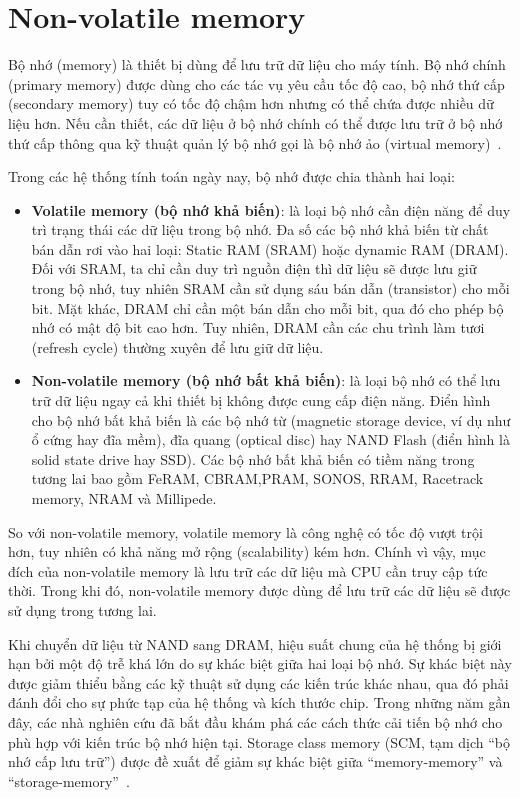 \section{Non-volatile memory}
\label{chap:non-volatile-memory}

Bộ nhớ (memory) là thiết bị dùng để lưu trữ dữ liệu cho máy tính. Bộ nhớ chính
(primary memory) được dùng cho các tác vụ yêu cầu tốc độ cao, bộ nhớ thứ cấp
(secondary memory) tuy có tốc độ chậm hơn nhưng có thể chứa được nhiều dữ liệu
hơn. Nếu cần thiết, các dữ liệu ở bộ nhớ chính có thể được lưu trữ ở bộ nhớ thứ
cấp thông qua kỹ thuật quản lý bộ nhớ gọi là bộ nhớ ảo (virtual
memory)~\cite{VolatileNonVolatileComputer}.

Trong các hệ thống tính toán ngày nay, bộ nhớ được chia thành hai loại:

\begin{itemize}
    \item \textbf{Volatile memory (bộ nhớ khả biến)}: là loại bộ nhớ cần điện
    năng để duy trì trạng thái các dữ liệu trong bộ nhớ. Đa số các bộ nhớ khả
    biến từ chất bán dẫn rơi vào hai loại: Static RAM (SRAM) hoặc dynamic RAM
    (DRAM). Đối với SRAM, ta chỉ cần duy trì nguồn điện thì dữ liệu sẽ được lưu
    giữ trong bộ nhớ, tuy nhiên SRAM cần sử dụng sáu bán dẫn (transistor) cho
    mỗi bit. Mặt khác, DRAM chỉ cần một bán dẫn cho mỗi bit, qua đó cho phép bộ
    nhớ có mật độ bit cao hơn. Tuy nhiên, DRAM cần các chu trình làm tươi
    (refresh cycle) thường xuyên để lưu giữ dữ liệu.
    
    \item \textbf{Non-volatile memory (bộ nhớ bất khả biến)}: là loại bộ nhớ có
    thể lưu trữ dữ liệu ngay cả khi thiết bị không được cung cấp điện năng.
    Điển hình cho bộ nhớ bất khả biến là các bộ nhớ từ (magnetic storage
    device, ví dụ như ổ cứng hay đĩa mềm), đĩa quang (optical disc) hay NAND
    Flash (điển hình là solid state drive hay SSD). Các bộ nhớ bất khả biến có
    tiềm năng trong tương lai bao gồm FeRAM, CBRAM,PRAM, SONOS, RRAM, Racetrack
    memory, NRAM và Millipede.
\end{itemize}

So với non-volatile memory, volatile memory là công nghệ có tốc độ vượt trội
hơn, tuy nhiên có khả năng mở rộng (scalability) kém hơn. Chính vì vậy, mục
đích của non-volatile memory là lưu trữ các dữ liệu mà CPU cần truy cập tức
thời. Trong khi đó, non-volatile memory được dùng để lưu trữ các dữ liệu sẽ
được sử dụng trong tương lai.

Khi chuyển dữ liệu từ NAND sang DRAM, hiệu suất chung của hệ thống bị giới hạn
bởi một độ trễ khá lớn do sự khác biệt giữa hai loại bộ nhớ. Sự khác biệt này
được giảm thiểu bằng các kỹ thuật sử dụng các kiến trúc khác nhau, qua đó phải
đánh đổi cho sự phức tạp của hệ thống và kích thước chip. Trong những năm gần
đây, các nhà nghiên cứu đã bắt đầu khám phá các cách thức cải tiến bộ nhớ cho
phù hợp với kiến trúc bộ nhớ hiện tại. Storage class memory (SCM, tạm dịch ``bộ
nhớ cấp lưu trữ'') được đề xuất để giảm sự khác biệt giữa ``memory-memory'' và
``storage-memory''~\cite{gouxOxRAMTechnologyDevelopment2019}.

